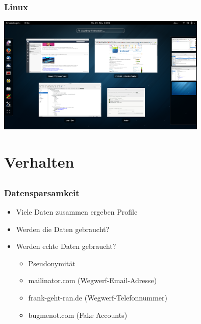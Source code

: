 \documentclass[12pt]{beamer}
\begin{document}
\begin{frame}
  \frametitle{Linux}
  \begin{center}
    \includegraphics[width=10cm]{img/gnome}
  \par\end{center}
\end{frame}

\section{Verhalten}
\subsection{}

\begin{frame}
    \frametitle{Datensparsamkeit}
    \begin{itemize}
        \item<2-> Viele Daten zusammen ergeben Profile
        \item<3-> Werden die Daten gebraucht?
        \item<4-> Werden echte Daten gebraucht?
            \begin{itemize}
              \item<5-> Pseudonymität
              \item<6-> mailinator.com (Wegwerf-Email-Adresse)
	      \item<7-> frank-geht-ran.de (Wegwerf-Telefonnummer)
              \item<8-> bugmenot.com (Fake Accounts)
            \end{itemize}
    \end{itemize}
\end{frame}
\end{document}
